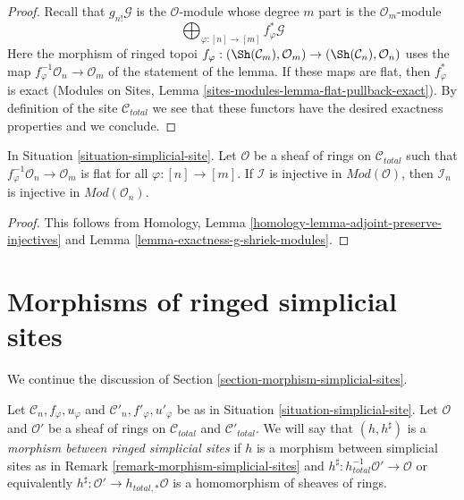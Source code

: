 \begin{proof}
Recall that $g_{n!}\mathcal{G}$ is the $\mathcal{O}$-module
whose degree $m$ part is the $\mathcal{O}_m$-module
$$
\bigoplus\nolimits_{\varphi : [n] \to [m]} f_\varphi^*\mathcal{G}
$$
Here the morphism of ringed topoi
$f_\varphi : (\Sh(\mathcal{C}_m), \mathcal{O}_m) \to
(\Sh(\mathcal{C}_n), \mathcal{O}_n)$ uses the map
$f_\varphi^{-1}\mathcal{O}_n \to \mathcal{O}_m$ of the
statement of the lemma. If these maps are flat, then
$f_\varphi^*$ is exact
(Modules on Sites, Lemma \ref{sites-modules-lemma-flat-pullback-exact}).
By definition of the site $\mathcal{C}_{total}$ we see that these
functors have the desired exactness properties and we conclude.
\end{proof}

\begin{lemma}
\label{lemma-restriction-injective-to-component-site-module}
In Situation \ref{situation-simplicial-site}.
Let $\mathcal{O}$ be a sheaf of rings on $\mathcal{C}_{total}$
such that $f_\varphi^{-1}\mathcal{O}_n \to \mathcal{O}_m$
is flat for all $\varphi : [n] \to [m]$.
If $\mathcal{I}$ is injective in $\textit{Mod}(\mathcal{O})$, then
$\mathcal{I}_n$ is injective in $\textit{Mod}(\mathcal{O}_n)$.
\end{lemma}

\begin{proof}
This follows from
Homology, Lemma \ref{homology-lemma-adjoint-preserve-injectives}
and
Lemma \ref{lemma-exactness-g-shriek-modules}.
\end{proof}







\section{Morphisms of ringed simplicial sites}
\label{section-morphism-simplicial-sites-modules}

\noindent
We continue the discussion of Section \ref{section-morphism-simplicial-sites}.

\begin{remark}
\label{remark-morphism-simplicial-sites-modules}
Let $\mathcal{C}_n, f_\varphi, u_\varphi$ and
$\mathcal{C}'_n, f'_\varphi, u'_\varphi$ be as in
Situation \ref{situation-simplicial-site}.
Let $\mathcal{O}$ and $\mathcal{O}'$
be a sheaf of rings on $\mathcal{C}_{total}$ and $\mathcal{C}'_{total}$.
We will say that $(h, h^\sharp)$ is a
{\it morphism between ringed simplicial sites}
if $h$ is a morphism between simplicial sites as in
Remark \ref{remark-morphism-simplicial-sites}
and $h^\sharp : h_{total}^{-1}\mathcal{O}' \to \mathcal{O}$
or equivalently $h^\sharp : \mathcal{O}' \to h_{total, *}\mathcal{O}$
is a homomorphism of sheaves of rings.
\end{remark}


